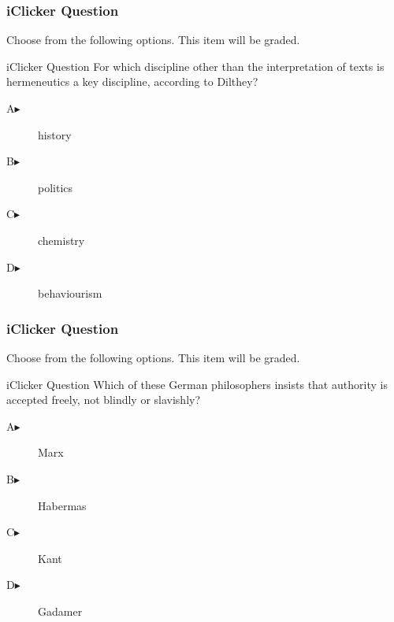\documentclass[xcolor=dvipsnames]{beamer}
\begin{document}
\begin{frame}
  \frametitle{iClicker Question}
Choose from the following options. This item will be graded.
\begin{block}{iClicker Question}
For which discipline other than the interpretation of texts is
hermeneutics a key discipline, according to Dilthey?
\end{block}
\begin{description}
\item[A\hspace{.2in}$\blacktriangleright$] history
\item[B\hspace{.2in}$\blacktriangleright$] politics
\item[C\hspace{.2in}$\blacktriangleright$] chemistry
\item[D\hspace{.2in}$\blacktriangleright$] behaviourism
\end{description}
\end{frame}

\begin{frame}
  \frametitle{iClicker Question}
Choose from the following options. This item will be graded.
\begin{block}{iClicker Question}
  Which of these German philosophers insists that authority is
  accepted freely, not blindly or slavishly?
\end{block}
\begin{description}
\item[A\hspace{.2in}$\blacktriangleright$] Marx
\item[B\hspace{.2in}$\blacktriangleright$] Habermas
\item[C\hspace{.2in}$\blacktriangleright$] Kant
\item[D\hspace{.2in}$\blacktriangleright$] Gadamer
\end{description}
\end{frame}
\end{document}
